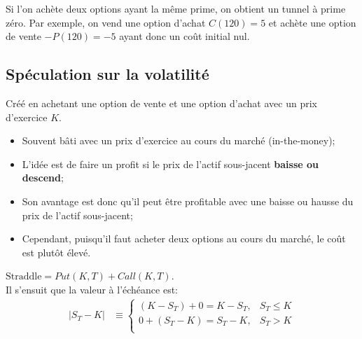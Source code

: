 \documentclass[10pt, french]{article}
\begin{document}
\begin{multicols*}{2}
\begin{definitionNOHFILL}
Si l'on achète deux options ayant la même prime, on obtient un tunnel à prime zéro. Par exemple, on vend une option d'achat $C(120) = 5$ et achète une option de vente $-P(120) = -5$ ayant donc un coût initial nul.
\end{definitionNOHFILL}

\columnbreak
\subsection{Spéculation sur la volatilité}
\begin{definitionNOHFILL}
Créé en achetant une option de vente et une option d'achat avec un prix d'exercice $K$.

\begin{distributions}[Contexte]
\begin{itemize}[leftmargin = *]
	\item	Souvent bâti avec un prix d'exercice au cours du marché (in-the-money);
	\item	L'idée est de faire un profit si le prix de l'actif sous-jacent \textbf{baisse ou descend};
	\item	Son avantage est donc qu'il peut être profitable avec une baisse ou hausse du prix de l'actif sous-jacent;
	\item	Cependant, puisqu'il faut acheter deux options au cours du marché, le coût est plutôt élevé.
\end{itemize}
\end{distributions}

$\text{Straddle} = Put(K, T) + Call(K, T)$.\\

Il s'ensuit que la valeur à l'échéance est:
\begin{align*}
	|S_{T} - K|	
	&\equiv	
		\begin{cases}
		(K - S_{T})	+	0	=	K - S_{T},	&	S_{T} \le K	\\
		0	+	(S_{T} - K)	=	S_{T} - K,	&	S_{T} >	K	\\
		\end{cases}
\end{align*}

\begin{center}
\begin{tikzpicture}[x=0.75pt,y=0.75pt,yscale=-1,xscale=1]


\end{tikzpicture}
\end{center}
\end{definitionNOHFILL}
\end{multicols*}
\end{document}
